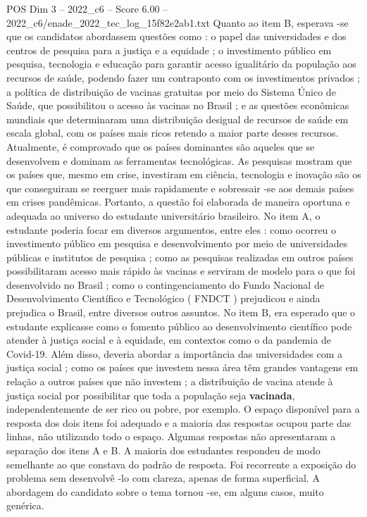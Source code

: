 \begin{textsample}{POS Dim 3 – 2022\_c6 – Score 6.00 – 2022\_c6/enade\_2022\_tec\_log\_15f82e2ab1.txt}
Quanto ao item B, esperava -se que os candidatos abordassem questões como : o papel das universidades e dos centros de pesquisa para a justiça e a equidade ; o investimento público em pesquisa, tecnologia e educação para garantir acesso igualitário da população aos recursos de saúde, podendo fazer um contraponto com os investimentos privados ; a política de distribuição de vacinas gratuitas por meio do Sistema Único de Saúde, que possibilitou o acesso às vacinas no Brasil ; e as questões econômicas mundiais que determinaram uma distribuição desigual de recursos de saúde em escala global, com os países mais ricos retendo a maior parte desses recursos.
Atualmente, é comprovado que os países dominantes são aqueles que se desenvolvem e dominam as ferramentas tecnológicas.
As pesquisas mostram que os países que, mesmo em crise, investiram em ciência, tecnologia e inovação são os que conseguiram se reerguer mais rapidamente e sobressair -se aos demais países em crises pandêmicas.
Portanto, a questão foi elaborada de maneira oportuna e adequada ao universo do estudante universitário brasileiro.
No item A, o estudante poderia focar em diversos argumentos, entre eles : como ocorreu o investimento público em pesquisa e desenvolvimento por meio de universidades públicas e institutos de pesquisa ; como as pesquisas realizadas em outros países possibilitaram acesso mais rápido às vacinas e serviram de modelo para o que foi desenvolvido no Brasil ; como o contingenciamento do Fundo Nacional de Desenvolvimento Científico e Tecnológico ( FNDCT ) prejudicou e ainda prejudica o Brasil, entre diversos outros assuntos.
No item B, era esperado que o estudante explicasse como o fomento público ao desenvolvimento científico pode atender à justiça social e à equidade, em contextos como o da pandemia de Covid-19.
Além disso, deveria abordar a importância das universidades com a justiça social ; como os países que investem nessa área têm grandes vantagens em relação a outros países que não investem ; a distribuição de vacina atende à justiça social por possibilitar que toda a população seja \textbf{vacinada}, independentemente de ser rico ou pobre, por exemplo.
O espaço disponível para a resposta dos dois itens foi adequado e a maioria das respostas ocupou parte das linhas, não utilizando todo o espaço.
Algumas respostas não apresentaram a separação dos itens A e B.
A maioria dos estudantes respondeu de modo semelhante ao que constava do padrão de resposta.
Foi recorrente a exposição do problema sem desenvolvê -lo com clareza, apenas de forma superficial.
A abordagem do candidato sobre o tema tornou -se, em alguns casos, muito genérica.

\end{textsample}

